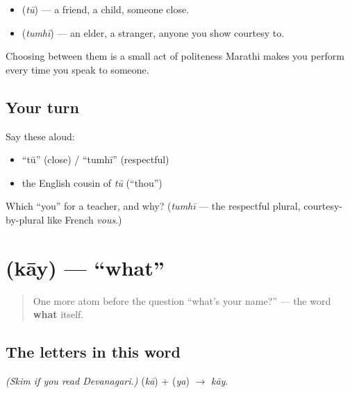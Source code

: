 \begin{grammarlens}[title={Grammar Lens: two \textquotedblleft{}you\textquotedblright{}s, a choice of respect}]
\begin{itemize}
\raggedright
  \item \textbf{} (\emph{tū}) — a friend, a child, someone close.
  \item \textbf{} (\emph{tumhī}) — an elder, a stranger, anyone you show courtesy to.
\end{itemize}

Choosing between them is a small act of politeness Marathi makes you perform every time you speak to someone.
\end{grammarlens}

\subsection*{Your turn}
Say these aloud:

\begin{itemize}
\raggedright
  \item \textquotedblleft{}tū\textquotedblright{} (close) / \textquotedblleft{}tumhī\textquotedblright{} (respectful)
  \item the English cousin of \emph{tū} (\textquotedblleft{}thou\textquotedblright{})
\end{itemize}

\begin{tcolorbox}[breakable,colback=teal!4,colframe=teal!35!black,title={Before you move on}]
Which \textquotedblleft{}you\textquotedblright{} for a teacher, and why? (\emph{tumhī} — the respectful plural, courtesy-by-plural like French \emph{vous}.)
\end{tcolorbox}
\section[\texorpdfstring{\mr{काय} (kāy)}{काय (kāy)}]{ (kāy) — \textquotedblleft{}what\textquotedblright{}}

\label{lesson:MR-C02-kaay}



\begin{quote}
One more atom before the question \textquotedblleft{}what's your name?\textquotedblright{} — the word \textbf{what} itself.
\end{quote}

\subsection*{The letters in this word}
\emph{(Skim if you read Devanagari.)} \textbf{} (\emph{kā}) + \textbf{} (\emph{ya}) $\to$ \textbf{} \emph{kāy}.

